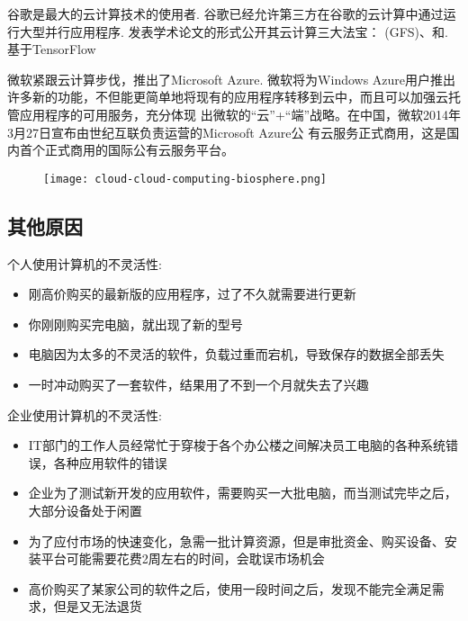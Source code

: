 谷歌是最大的云计算技术的使用者. 谷歌已经允许第三方在谷歌的云计算中通过运行大型并行应用程序. 发表学术论文的形式公开其云计算三大法宝： (GFS)、和. 基于TensorFlow


微软紧跟云计算步伐，推出了Microsoft Azure. 微软将为Windows Azure用户推出许多新的功能，不但能更简单地将现有的应用程序转移到云中，而且可以加强云托管应用程序的可用服务，充分体现 出微软的“云”+“端”战略。在中国，微软2014年3月27日宣布由世纪互联负责运营的Microsoft Azure公 有云服务正式商用，这是国内首个正式商用的国际公有云服务平台。

\begin{figure}[htbp]
    \centering
    \texttt{[image: cloud-cloud-computing-biosphere.png]}
\end{figure}

\subsection{其他原因}

个人使用计算机的不灵活性:

\begin{itemize}
    
    
    \item 刚高价购买的最新版的应用程序，过了不久就需要进行更新
    \item 你刚刚购买完电脑，就出现了新的型号
    \item 电脑因为太多的不灵活的软件，负载过重而宕机，导致保存的数据全部丢失
    \item 一时冲动购买了一套软件，结果用了不到一个月就失去了兴趣
\end{itemize}

企业使用计算机的不灵活性:

\begin{itemize}
    
    
    \item IT部门的工作人员经常忙于穿梭于各个办公楼之间解决员工电脑的各种系统错误，各种应用软件的错误
    \item 企业为了测试新开发的应用软件，需要购买一大批电脑，而当测试完毕之后，大部分设备处于闲置
    \item 为了应付市场的快速变化，急需一批计算资源，但是审批资金、购买设备、安装平台可能需要花费2周左右的时间，会耽误市场机会
    \item 高价购买了某家公司的软件之后，使用一段时间之后，发现不能完全满足需求，但是又无法退货
\end{itemize}

